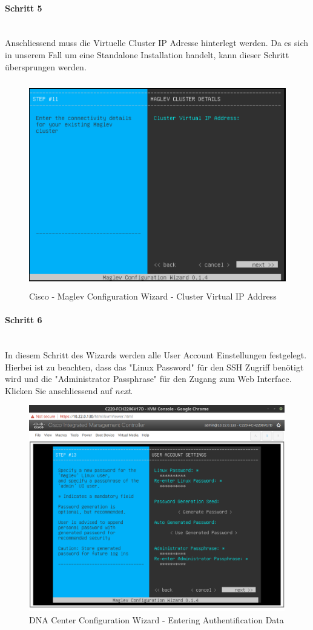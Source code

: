 \paragraph{Schritt 5}
~\\
Anschliessend muss die Virtuelle Cluster IP Adresse hinterlegt werden. Da es sich in unserem Fall um eine Standalone Installation handelt, kann dieser Schritt übersprungen werden. 
\begin{figure}[H]
	\centering
	\includegraphics[height=9cm]{img/installguide/installguide-step11.PNG}
	\caption{Cisco - Maglev Configuration Wizard - Cluster Virtual IP Address}
	\label{fig:installguide-dna-center-install-step-11}
\end{figure} 

\paragraph{Schritt 6}
~\\
In diesem Schritt des Wizards werden alle User Account Einstellungen festgelegt. Hierbei ist zu beachten, dass das "Linux Password" für den SSH Zugriff benötigt wird und die "Administrator Passphrase" für den Zugang zum Web Interface. Klicken Sie anschliessend auf \textit{next}.

\begin{figure}[H]
	\centering
	\includegraphics[height=9cm]{img/sc_003.png}
	\caption{DNA Center Configuration Wizard - Entering Authentification Data}
	\label{fig:installguide-dna-center-install-step-13}
\end{figure}

